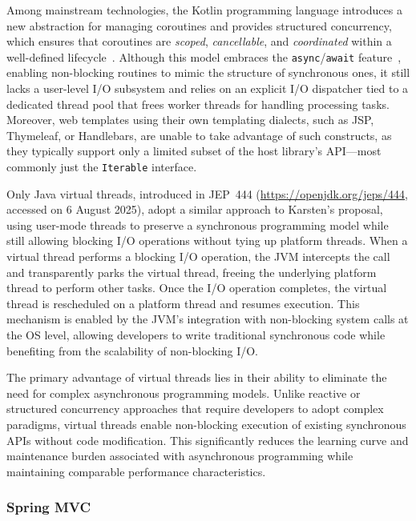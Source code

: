 \documentclass[software,article,accept,pdftex,moreauthors]{Definitions/mdpi}
\begin{document}
Among mainstream technologies, the Kotlin programming language introduces a new
abstraction for managing coroutines and provides structured concurrency, which
ensures that coroutines are \textit{scoped}, \textit{cancellable}, and
\textit{coordinated} within a well-defined
lifecycle~\cite{elizarov2021coroutines}. Although this model embraces the
\texttt{async}/\texttt{await} feature~\cite{async_await}, enabling non-blocking
routines to mimic the structure of synchronous ones, it still lacks a
user-level I/O subsystem and relies on an explicit I/O dispatcher tied to a
dedicated thread pool that frees worker threads for handling processing tasks.
Moreover, web templates using their own templating dialects, such as JSP,
Thymeleaf, or Handlebars, are unable to take advantage of such constructs, as
they typically support only a limited subset of the host library's API---most
commonly just the \texttt{Iterable} interface.

Only Java virtual threads, introduced in
JEP~444 ({\url{https://openjdk.org/jeps/444}}, accessed on 6 August 2025), adopt a similar approach
to Karsten's proposal, using user-mode threads to preserve a synchronous
programming model while still allowing blocking I/O operations without tying up
platform threads. When a virtual thread performs a blocking I/O operation, the
JVM intercepts the call and transparently parks the virtual thread, freeing the
underlying platform thread to perform other tasks. Once the I/O operation
completes, the virtual thread is rescheduled on a platform thread and resumes
execution. This mechanism is enabled by the JVM's integration with non-blocking
system calls at the OS level, allowing developers to write traditional
synchronous code while benefiting from the scalability of non-blocking I/O.

The primary advantage of virtual threads lies in their ability to eliminate the
need for complex asynchronous programming models. Unlike reactive or structured
concurrency approaches that require developers to adopt complex paradigms, virtual
threads enable non-blocking execution of existing synchronous APIs without code
modification. This significantly reduces the learning curve and maintenance
burden associated with asynchronous programming while maintaining comparable
performance characteristics.

\subsubsection{Spring MVC}
\end{document}
